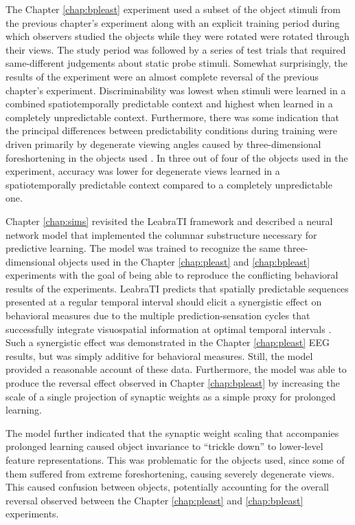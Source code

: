 \documentclass[dwyatte_dissertation.tex]{subfiles}
\begin{document}
The Chapter \ref{chap:bpleast} experiment used a subset of the object stimuli from the previous chapter's experiment along with an explicit training period during which observers studied the objects while they were rotated were rotated through their views. The study period was followed by a series of test trials that required same-different judgements about static probe stimuli. Somewhat surprisingly, the results of the experiment were an almost complete reversal of the previous chapter's experiment. Discriminability was lowest when stimuli were learned in a combined spatiotemporally predictable context and highest when learned in a completely unpredictable context. Furthermore, there was some indication that the principal differences between predictability conditions during training were driven primarily by degenerate viewing angles caused by three-dimensional foreshortening in the objects used \cite{BalasSinha09b,FarahRochlinKlen94,PizloStevenson99}. In three out of four of the objects used in the experiment, accuracy was lower for degenerate views learned in a spatiotemporally predictable context compared to a completely unpredictable one.


Chapter \ref{chap:sims} revisited the LeabraTI framework and described a neural network model that implemented the columnar substructure necessary for predictive learning. The model was trained to recognize the same three-dimensional objects used in the Chapter \ref{chap:pleast} and \ref{chap:bpleast} experiments with the goal of being able to reproduce the conflicting behavioral results of the experiments. LeabraTI predicts that spatially predictable sequences presented at a regular temporal interval should elicit a synergistic effect on behavioral measures due to the multiple prediction-sensation cycles that successfully integrate visuospatial information at optimal temporal intervals \cite[see also]{DohertyRaoMesulamEtAl05,RohenkohlGouldPessoaEtAl14}. Such a synergistic effect was demonstrated in the Chapter \ref{chap:pleast} EEG results, but was simply additive for behavioral measures. Still, the model provided a reasonable account of these data. Furthermore, the model was able to produce the reversal effect observed in Chapter \ref{chap:bpleast} by increasing the scale of a single projection of synaptic weights as a simple proxy for prolonged learning. 

The model further indicated that the synaptic weight scaling that accompanies prolonged learning caused object invariance to ``trickle down'' to lower-level feature representations. This was problematic for the objects used, since some of them suffered from extreme foreshortening, causing severely degenerate views. This caused confusion between objects, potentially accounting for the overall reversal observed between the Chapter \ref{chap:pleast} and \ref{chap:bpleast} experiments.
\end{document}
